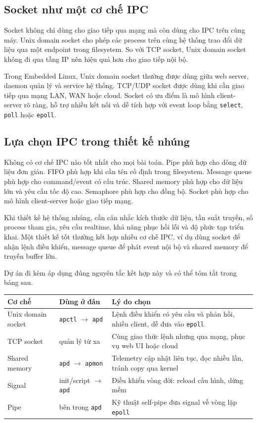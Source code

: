 \documentclass[11pt]{article}
\newcommand{\code}[1]{\texttt{#1}}
\begin{document}
\subsection{Socket như một cơ chế IPC}

Socket không chỉ dùng cho giao tiếp qua mạng mà còn dùng cho IPC trên cùng máy. Unix domain socket cho phép các process trên cùng hệ thống trao đổi dữ liệu qua một endpoint trong filesystem. So với TCP socket, Unix domain socket không đi qua tầng IP nên hiệu quả hơn cho giao tiếp nội bộ.

Trong Embedded Linux, Unix domain socket thường được dùng giữa web server, daemon quản lý và service hệ thống. TCP/UDP socket được dùng khi cần giao tiếp qua mạng LAN, WAN hoặc cloud. Socket có ưu điểm là mô hình client-server rõ ràng, hỗ trợ nhiều kết nối và dễ tích hợp với event loop bằng \code{select}, \code{poll} hoặc \code{epoll}.

\subsection{Lựa chọn IPC trong thiết kế nhúng}

Không có cơ chế IPC nào tốt nhất cho mọi bài toán. Pipe phù hợp cho dòng dữ liệu đơn giản. FIFO phù hợp khi cần tên cố định trong filesystem. Message queue phù hợp cho command/event có cấu trúc. Shared memory phù hợp cho dữ liệu lớn và yêu cầu tốc độ cao. Semaphore phù hợp cho đồng bộ. Socket phù hợp cho mô hình client-server hoặc giao tiếp mạng.

Khi thiết kế hệ thống nhúng, cần cân nhắc kích thước dữ liệu, tần suất truyền, số process tham gia, yêu cầu realtime, khả năng phục hồi lỗi và độ phức tạp triển khai. Một thiết kế tốt thường kết hợp nhiều cơ chế IPC, ví dụ dùng socket để nhận lệnh điều khiển, message queue để phát event nội bộ và shared memory để truyền buffer lớn.

Dự án đi kèm áp dụng đúng nguyên tắc kết hợp này và có thể tóm tắt trong bảng sau.

\begin{center}
\begin{tabular}{llp{6.2cm}}
\toprule
\textbf{Cơ chế} & \textbf{Dùng ở đâu} & \textbf{Lý do chọn} \\
\midrule
Unix domain socket & \code{apctl} $\rightarrow$ \code{apd} & Lệnh điều khiển có yêu cầu và phản hồi, nhiều client, dễ đưa vào \code{epoll} \\
TCP socket & quản lý từ xa & Cùng giao thức lệnh nhưng qua mạng, phục vụ web UI hoặc cloud \\
Shared memory & \code{apd} $\rightarrow$ \code{apmon} & Telemetry cập nhật liên tục, đọc nhiều lần, tránh copy qua kernel \\
Signal & init/script $\rightarrow$ \code{apd} & Điều khiển vòng đời: reload cấu hình, dừng mềm \\
Pipe & bên trong \code{apd} & Kỹ thuật self-pipe đưa signal về vòng lặp \code{epoll} \\
\bottomrule
\end{tabular}
\end{center}
\end{document}
